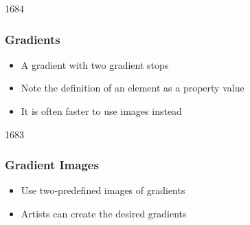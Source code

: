 
\begin{slide}{1684}\frametitle{Gradients}


\begin{itemize}
\item A gradient with two gradient stops
\item Note the definition of an element as a property value
\item It is often faster to use images instead
\end{itemize}                                


\end{slide}


\begin{slide}{1683}\frametitle{Gradient Images}


\begin{itemize}
\item Use two-predefined images of gradients
\item Artists can create the desired gradients
\end{itemize}

\end{slide}
